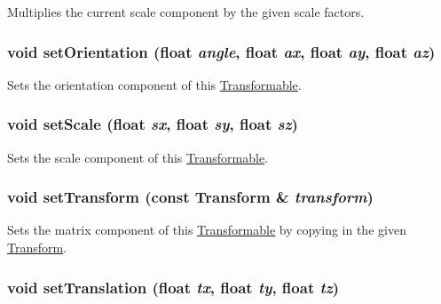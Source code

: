 Multiplies the current scale component by the given scale factors. \hypertarget{classm3g_1_1Transformable_980a9a2b5f6102763042e616d3aa4606}{
\subsubsection[{setOrientation}]{\setlength{\rightskip}{0pt plus 5cm}void setOrientation (float {\em angle}, \/  float {\em ax}, \/  float {\em ay}, \/  float {\em az})}}
\label{classm3g_1_1Transformable_980a9a2b5f6102763042e616d3aa4606}


Sets the orientation component of this \hyperlink{classm3g_1_1Transformable}{Transformable}. \hypertarget{classm3g_1_1Transformable_937d04042c25021532ea2532fe5e3a32}{
\subsubsection[{setScale}]{\setlength{\rightskip}{0pt plus 5cm}void setScale (float {\em sx}, \/  float {\em sy}, \/  float {\em sz})}}
\label{classm3g_1_1Transformable_937d04042c25021532ea2532fe5e3a32}


Sets the scale component of this \hyperlink{classm3g_1_1Transformable}{Transformable}. \hypertarget{classm3g_1_1Transformable_05052269aaf19775f3ff1a10d042777e}{
\subsubsection[{setTransform}]{\setlength{\rightskip}{0pt plus 5cm}void setTransform (const {\bf Transform} \& {\em transform})}}
\label{classm3g_1_1Transformable_05052269aaf19775f3ff1a10d042777e}


Sets the matrix component of this \hyperlink{classm3g_1_1Transformable}{Transformable} by copying in the given \hyperlink{classm3g_1_1Transform}{Transform}. \hypertarget{classm3g_1_1Transformable_afd728a7db85b8e12bdafc2b3c08a515}{
\subsubsection[{setTranslation}]{\setlength{\rightskip}{0pt plus 5cm}void setTranslation (float {\em tx}, \/  float {\em ty}, \/  float {\em tz})}}
\label{classm3g_1_1Transformable_afd728a7db85b8e12bdafc2b3c08a515}


